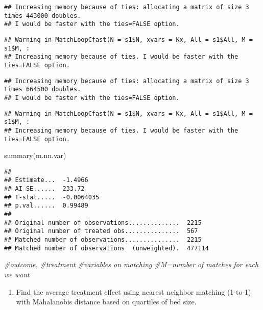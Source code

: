 \documentclass[
]{article}
\newenvironment{Shaded}{\begin{snugshade}}{\end{snugshade}}
\newcommand{\CommentTok}[1]{\textcolor[rgb]{0.56,0.35,0.01}{\textit{#1}}}
\newcommand{\FunctionTok}[1]{\textcolor[rgb]{0.00,0.00,0.00}{#1}}
\newcommand{\NormalTok}[1]{#1}
\providecommand{\tightlist}{%
  \setlength{\itemsep}{0pt}\setlength{\parskip}{0pt}}
\begin{document}
\begin{verbatim}
## Increasing memory because of ties: allocating a matrix of size 3 times 443000 doubles.
## I would be faster with the ties=FALSE option.
\end{verbatim}

\begin{verbatim}
## Warning in MatchLoopCfast(N = s1$N, xvars = Kx, All = s1$All, M = s1$M, :
## Increasing memory because of ties. I would be faster with the ties=FALSE option.
\end{verbatim}

\begin{verbatim}
## Increasing memory because of ties: allocating a matrix of size 3 times 664500 doubles.
## I would be faster with the ties=FALSE option.
\end{verbatim}

\begin{verbatim}
## Warning in MatchLoopCfast(N = s1$N, xvars = Kx, All = s1$All, M = s1$M, :
## Increasing memory because of ties. I would be faster with the ties=FALSE option.
\end{verbatim}

\begin{Shaded}
\begin{Highlighting}[]
\FunctionTok{summary}\NormalTok{(m.nn.var)}
\end{Highlighting}
\end{Shaded}

\begin{verbatim}
## 
## Estimate...  -1.4966 
## AI SE......  233.72 
## T-stat.....  -0.0064035 
## p.val......  0.99489 
## 
## Original number of observations..............  2215 
## Original number of treated obs...............  567 
## Matched number of observations...............  2215 
## Matched number of observations  (unweighted).  477114
\end{verbatim}

\begin{Shaded}
\begin{Highlighting}[]
\CommentTok{\#outcome,}
\CommentTok{\#treatment}
\CommentTok{\#variables on matching}
\CommentTok{\#M=number of matches for each we want}
\end{Highlighting}
\end{Shaded}

\begin{enumerate}
\def\labelenumi{\arabic{enumi}.}
\setcounter{enumi}{3}
\tightlist
\item
  Find the average treatment effect using nearest neighbor matching
  (1-to-1) with Mahalanobis distance based on quartiles of bed size.
\end{enumerate}
\end{document}
